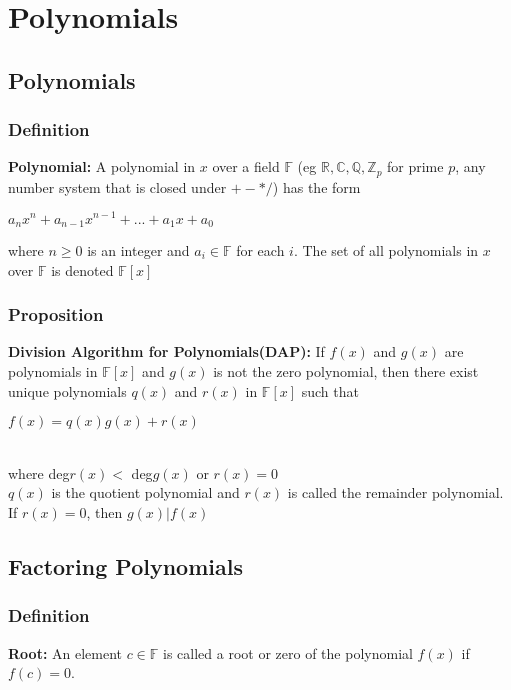 \documentclass[12pt]{report}
\begin{document}
\chapter{Polynomials}
	\section{Polynomials}
		\subsection{Definition}
			\textbf{Polynomial:} A polynomial in $x$ over a field $\mathbb{F}$ (eg $\mathbb{R}, \mathbb{C}, \mathbb{Q}, \mathbb{Z}_p$ for prime $p$, any number system that is closed under $+-*/$) has the form \\
			\centerline{$a_nx^n + a_{n-1}x^{n-1} + ... + a_1x + a_0$} where $n \geq 0$ is an integer and $a_i \in \mathbb{F}$ for each $i$. The set of all polynomials in $x$ over $\mathbb{F}$ is denoted $\mathbb{F}[x]$	
		\subsection{Proposition}
			\textbf{Division Algorithm for Polynomials(DAP):} If $f(x)$ and $g(x)$ are polynomials in $\mathbb{F}[x]$ and $g(x)$ is not the zero polynomial, then there exist unique polynomials $q(x)$ and $r(x)$ in $\mathbb{F}[x]$ such that \\
			\centerline{$f(x) = q(x)g(x) + r(x)$}\\
			where deg$r(x) < $ deg$g(x)$ or $r(x) = 0$\\
			$q(x)$ is the quotient polynomial and $r(x)$ is called the remainder polynomial. If $r(x)=0$, then $g(x)|f(x)$
	\section{Factoring Polynomials}
		\subsection{Definition}
			\textbf{Root:} An element $c \in \mathbb{F}$ is called a root or zero of the polynomial $f(x)$ if $f(c) = 0$. 
			\\
\end{document}
